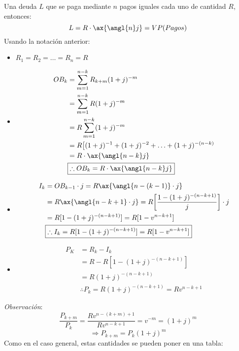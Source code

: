 Una deuda $L$ que se paga mediante $n$ pagos iguales cada uno de cantidad $R$, entonces:
$$L=R\cdot \ax{\angl{n} j} = VP(Pagos)$$
Usando la notación anterior:
\begin{itemize}
    \item $R_1=R_2=\dotsc=R_n=R$
    \item \begin{align*}
        OB_k &= \sum_{m=1}^{n-k}R_{k+m}(1+j)^{-m} \\
        &= \sum_{m=1}^{n-k}R(1+j)^{-m}\\
        &= R\sum_{m=1}^{n-k}(1+j)^{-m}\\
        &= R\big[(1+j)^{-1} + (1+j)^{-2}+\dotsc + (1+j)^{-(n-k)}\\
        &= R\cdot \ax{\angl{n-k}j}\\
        &\boxed{\therefore OB_k = R\cdot\ax{\angl{n-k}j}}
    \end{align*}
    \item \begin{align*} 
        I_k &= OB_{k-1}\cdot j = R\ax{\angl{n-(k-1)}\cdot j}\\
        &= R\ax{\angl{n-k+1}\cdot j} = R\bigg[\frac{1-(1+j)^{-(n-k+1)}}{j}\bigg]\cdot j\\
        &= R[1-(1+j)^{-(n-k+1)}] = R[1-v^{n-k+1}]\\
        &\boxed{\therefore I_k = R[1-(1+j)^{-(n-k+1)}] = R[1-v^{n-k+1}]}
    \end{align*}
    \item \begin{align*}
        P_K &= R_k - I_k\\
        &= R- R[1-(1+j)^{-(n-k+1)}]\\
        &= R(1+j)^{-(n-k+1)}\\
        &\boxed{\therefore P_k = R(1+j)^{-(n-k+1)} = Rv^{n-k+1}}
    \end{align*}
\end{itemize}

\textit{Observación}:
$$\frac{P_{k+m}}{P_k} = \frac{Rv^{n-(k+m)+1}}{Rv^{n-k+1}} = v^{-m} = (1+j)^m$$
$$\Rightarrow \boxed{P_{k+m} = P_k(1+j)^m}$$
\newpage
Como en el caso general, estas cantidades se pueden poner en una tabla:

